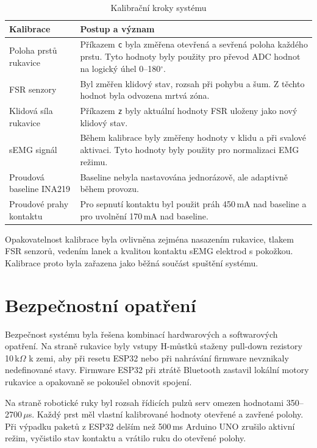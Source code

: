 \begin{table}[htbp]
\centering
\caption{Kalibrační kroky systému}
\label{tab:kalibrace-systemu}
\begin{tabular}{|p{}|p{}|}
\hline
\textbf{Kalibrace} & \textbf{Postup a význam} \\
\hline
Poloha prstů rukavice & Příkazem \texttt{c} byla změřena otevřená a sevřená poloha každého prstu. Tyto hodnoty byly použity pro převod ADC hodnot na logický úhel 0--180$^\circ$. \\
\hline
FSR senzory & Byl změřen klidový stav, rozsah při pohybu a šum. Z těchto hodnot byla odvozena mrtvá zóna. \\
\hline
Klidová síla rukavice & Příkazem \texttt{z} byly aktuální hodnoty FSR uloženy jako nový klidový stav. \\
\hline
sEMG signál & Během kalibrace byly změřeny hodnoty v klidu a při svalové aktivaci. Tyto hodnoty byly použity pro normalizaci EMG režimu. \\
\hline
Proudová baseline INA219 & Baseline nebyla nastavována jednorázově, ale adaptivně během provozu. \\
\hline
Proudové prahy kontaktu & Pro sepnutí kontaktu byl použit práh 450\,mA nad baseline a pro uvolnění 170\,mA nad baseline. \\
\hline
\end{tabular}
\end{table}

Opakovatelnost kalibrace byla ovlivněna zejména nasazením rukavice, tlakem FSR senzorů, vedením lanek a kvalitou kontaktu sEMG elektrod s pokožkou. Kalibrace proto byla zařazena jako běžná součást spuštění systému.

\section{Bezpečnostní opatření}
\label{sec:bezpecnostni-opatreni}

Bezpečnost systému byla řešena kombinací hardwarových a softwarových opatření. Na straně rukavice byly vstupy H-můstků staženy pull-down rezistory 10\,k$\Omega$ k zemi, aby při resetu ESP32 nebo při nahrávání firmware nevznikaly nedefinované stavy. Firmware ESP32 při ztrátě Bluetooth zastavil lokální motory rukavice a opakovaně se pokoušel obnovit spojení.

Na straně robotické ruky byl rozsah řídicích pulzů serv omezen hodnotami 350--2700\,$\mu$s. Každý prst měl vlastní kalibrované hodnoty otevřené a zavřené polohy. Při výpadku paketů z ESP32 delším než 500\,ms Arduino UNO zrušilo aktivní režim, vyčistilo stav kontaktu a vrátilo ruku do otevřené polohy.

